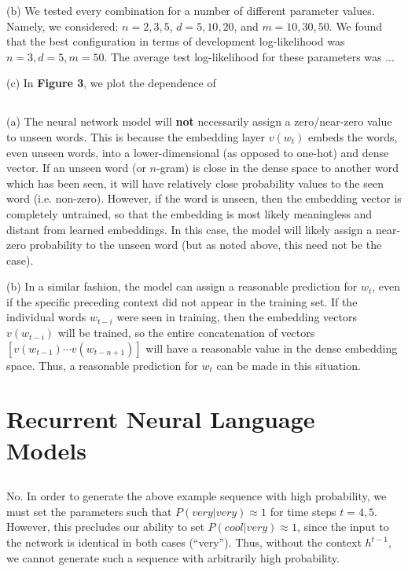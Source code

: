 \documentclass[psamsfonts]{amsart}
\theoremstyle{definition}
\theoremstyle{remark}
\numberwithin{equation}{section}
\begin{document}
(b) We tested every combination for a number of different parameter values. Namely, we considered: $n = 2, 3, 5$, $d = 5, 10, 20$, and $m = 10, 30, 50$. We found that the best configuration in terms of development log-likelihood was $n=3, d = 5, m = 50$. The average test log-likelihood for these parameters was ...

(c) In {\bf Figure 3}, we plot the dependence of 

\subsection{} (a) The neural network model will {\bf not} necessarily assign a zero/near-zero value to unseen words. This is because the embedding layer $v(w_{t})$ embeds the words, even unseen words, into a lower-dimensional (as opposed to one-hot) and dense vector. If an unseen word (or $n$-gram) is close in the dense space to another word which has been seen, it will have relatively close probability values to the seen word (i.e. non-zero). However, if the word is unseen, then the embedding vector is completely untrained, so that the embedding is most likely meaningless and distant from learned embeddings. In this case, the model will likely assign a near-zero probability to the unseen word (but as noted above, this need not be the case).

(b) In a similar fashion, the model can assign a reasonable prediction for $w_t$, even if the specific preceding context did not appear in the training set. If the individual words $w_{t-i}$ were seen in training, then the embedding vectors $v(w_{t-i})$ will be trained, so the entire concatenation of vectors $[v(w_{t-1}) \cdots v(w_{t-n+1})]$ will have a reasonable value in the dense embedding space. Thus, a reasonable prediction for $w_t$ can be made in this situation.

\subsection{}

\section{Recurrent Neural Language Models}

\subsection{} No. In order to generate the above example sequence with high probability, we must set the parameters such that $P(very|very) \approx 1$ for time steps $t = 4, 5$. However, this precludes our ability to set $P(cool|very) \approx 1$, since the input to the network is identical in both cases (``very''). Thus, without the context $h^{t-1}$, we cannot generate such a sequence with arbitrarily high probability.
\end{document}
